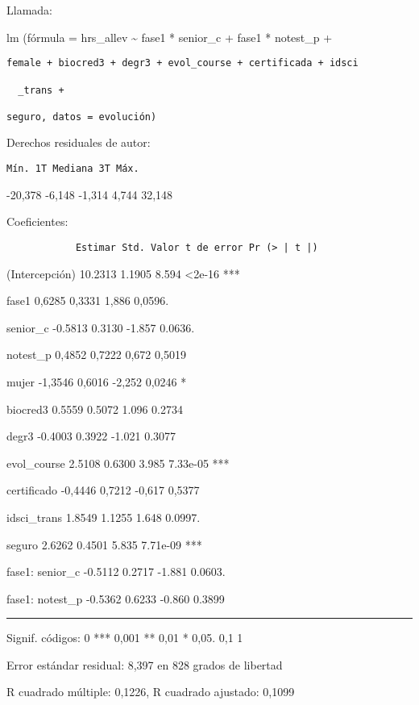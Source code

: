 \documentclass[
]{book}
\begin{document}
Llamada:

lm (fórmula = hrs\_allev \textasciitilde{} fase1 * senior\_c + fase1 * notest\_p +

\begin{verbatim}
female + biocred3 + degr3 + evol_course + certificada + idsci

  _trans +

seguro, datos = evolución)
\end{verbatim}

Derechos residuales de autor:

\begin{verbatim}
Mín. 1T Mediana 3T Máx.
\end{verbatim}

-20,378 -6,148 -1,314 4,744 32,148

Coeficientes:

\begin{verbatim}
            Estimar Std. Valor t de error Pr (> | t |)
\end{verbatim}

(Intercepción) 10.2313 1.1905 8.594 \textless2e-16 ***

fase1 0,6285 0,3331 1,886 0,0596.

senior\_c -0.5813 0.3130 -1.857 0.0636.

notest\_p 0,4852 0,7222 0,672 0,5019

mujer -1,3546 0,6016 -2,252 0,0246 *

biocred3 0.5559 0.5072 1.096 0.2734

degr3 -0.4003 0.3922 -1.021 0.3077

evol\_course 2.5108 0.6300 3.985 7.33e-05 ***

certificado -0,4446 0,7212 -0,617 0,5377

idsci\_trans 1.8549 1.1255 1.648 0.0997.

seguro 2.6262 0.4501 5.835 7.71e-09 ***

fase1: senior\_c -0.5112 0.2717 -1.881 0.0603.

fase1: notest\_p -0.5362 0.6233 -0.860 0.3899

\begin{center}\rule{0.5\linewidth}{0.5pt}\end{center}

Signif. códigos: 0 *** 0,001 ** 0,01 * 0,05. 0,1 1

Error estándar residual: 8,397 en 828 grados de libertad

R cuadrado múltiple: 0,1226, R cuadrado ajustado: 0,1099
\end{document}
